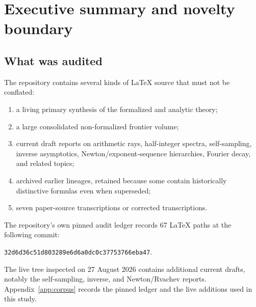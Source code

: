 \documentclass[11pt]{article}
\theoremstyle{definition}
\theoremstyle{remark}
\begin{document}
\begin{abstract}
For the signed Thue--Morse generating function \(E(z)\), a new formal orthogonality
analysis proves
\[
 p_{2n}(x)=p_n(x^2),\qquad a_n=(-1)^{n+1},
\]
and gives an exact nonlinear dyadic recursion for the remaining Jacobi coefficients.
At \(N=2^m\), \(p_N(x)=x^N+1\), producing the closed Pad\'e approximant
\[
 E(z)=\frac{\prod_{j<m}(1-z^{2^j})}{1+z^N}+O(z^{2N}).
\]
Its roots-of-minus-one partial fractions furnish an \(N\)-node complex quadrature that
reproduces \(2N\) consecutive Thue--Morse signs.  Krawtchouk, contour, residue, integral,
and antiperiodic Fourier representations of the signed and unsigned words are collected as
well.  A fully commented Python program, exact rational data, high-precision residuals,
and four reproducible figures accompany the report.  Every theorem labelled as new is
proved here; conjectures are clearly separated from established statements.
\end{abstract}

\tableofcontents
\newpage

\section{Executive summary and novelty boundary}

\subsection{What was audited}

The repository contains several kinds of LaTeX source that must not be conflated:

\begin{enumerate}
\item a living primary synthesis of the formalized and analytic theory;
\item a large consolidated non-formalized frontier volume;
\item current draft reports on arithmetic rays, half-integer spectra, self-sampling,
      inverse asymptotics, Newton/exponent-sequence hierarchies, Fourier decay, and related
      topics;
\item archived earlier lineages, retained because some contain historically distinctive
      formulas even when superseded;
\item seven paper-source transcriptions or corrected transcriptions.
\end{enumerate}

The repository's own pinned audit ledger records 67 LaTeX paths at the following commit:
\begin{center}
\small\texttt{32d6d36c51d803289e6d6a0dc0c37753766eba47}.
\end{center}
The live tree inspected on 27 August 2026 contains additional current drafts, notably the
self-sampling, inverse, and Newton/Rvachev reports.  Appendix~\ref{app:corpus} records the pinned ledger and the live
additions used in this study.
\end{document}
